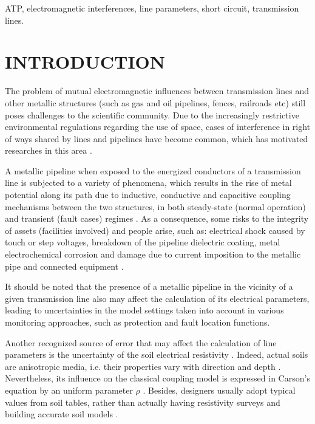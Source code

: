 \documentclass[conference]{IEEEtran}
\begin{document}
\begin{IEEEkeywords}
ATP, electromagnetic interferences, line parameters, short circuit, transmission lines.
\end{IEEEkeywords}

\section{INTRODUCTION}

The problem of mutual electromagnetic influences between transmission lines and other metallic structures (such as gas and oil pipelines, fences, railroads etc) still poses challenges to the scientific community. Due to the increasingly restrictive environmental regulations regarding the use of space, cases of interference in right of ways shared by lines and pipelines have become common, which has motivated researches in this area \cite{CIGREWG36,Christoforidis2005}.

A metallic pipeline when exposed to the energized conductors of a transmission line is subjected to a variety of phenomena, which results in the rise of metal potential along its path due to inductive, conductive and capacitive coupling mechanisms between the two structures, in both steady-state (normal operation) and transient (fault cases) regimes \cite{CIGREWG36,Christoforidis2005}. As a consequence, some risks to the integrity of assets (facilities involved) and people arise, such as: electrical shock caused by touch or step voltages, breakdown of the pipeline dielectric coating, metal electrochemical corrosion and damage due to current imposition to the metallic pipe and connected equipment \cite{CIGREWG36}. 

It should be noted that the presence of a metallic pipeline in the vicinity of a given transmission line also may affect the calculation of its electrical parameters, leading to uncertainties in the model settings taken into account in various monitoring approaches, such as protection and fault location functions.

Another recognized source of error that may affect the calculation of line parameters is the uncertainty of the soil electrical resistivity \cite{Das2014}. Indeed, actual soils are anisotropic media, i.e. their properties vary with direction and depth \cite{He2012}. Nevertheless, its influence on the classical coupling model is expressed in Carson's equation by an uniform parameter $\rho$ \cite{Carson1926}. Besides, designers usually adopt typical values from soil tables, rather than actually having resistivity surveys and building accurate soil models \cite{Whelan2010}. 
\end{document}
